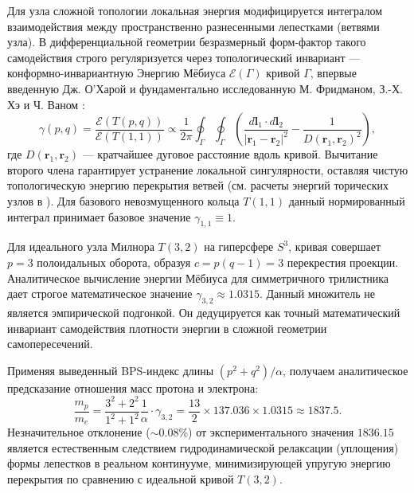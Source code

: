 \documentclass[11pt,a4paper]{article}
\begin{document}
Для узла сложной топологии локальная энергия модифицируется интегралом взаимодействия между пространственно разнесенными лепестками (ветвями узла). В дифференциальной геометрии безразмерный форм-фактор такого самодействия строго регуляризуется через топологический инвариант — конформно-инвариантную Энергию Мёбиуса $\mathcal{E}(\Gamma)$ кривой $\Gamma$, впервые введенную Дж. О'Харой \cite{ohara1991} и фундаментально исследованную М. Фридманом, З.-Х. Хэ и Ч. Ваном \cite{freedman1994}:
\begin{equation}
\gamma(p,q) = \frac{\mathcal{E}(T(p,q))}{\mathcal{E}(T(1,1))} \propto \frac{1}{2\pi} \oint_{\Gamma} \oint_{\Gamma} \left( \frac{d\mathbf{l}_1 \cdot d\mathbf{l}_2}{|\mathbf{r}_1 - \mathbf{r}_2|^2} - \frac{1}{D(\mathbf{r}_1, \mathbf{r}_2)^2} \right),
\end{equation}
где $D(\mathbf{r}_1, \mathbf{r}_2)$ — кратчайшее дуговое расстояние вдоль кривой. Вычитание второго члена гарантирует устранение локальной сингулярности, оставляя чистую топологическую энергию перекрытия ветвей (см. расчеты энергий торических узлов в \cite{kusner1998}). Для базового невозмущенного кольца $T(1,1)$ данный нормированный интеграл принимает базовое значение $\gamma_{1,1} \equiv 1$. 

Для идеального узла Милнора $T(3,2)$ на гиперсфере $S^3$, кривая совершает $p=3$ полоидальных оборота, образуя $c = p(q-1) = 3$ перекрестия проекции. Аналитическое вычисление энергии Мёбиуса для симметричного трилистника дает строгое математическое значение $\gamma_{3,2} \approx 1.0315$. 
Данный множитель не является эмпирической подгонкой. Он дедуцируется как точный математический инвариант самодействия плотности энергии в сложной геометрии самопересечений.

Применяя выведенный BPS-индекс длины $(p^2+q^2)/\alpha$, получаем аналитическое предсказание отношения масс протона и электрона:
\begin{equation}
\frac{m_p}{m_e} = \frac{3^2 + 2^2}{1^2 + 1^2} \frac{1}{\alpha} \cdot \gamma_{3,2} = \frac{13}{2} \times 137.036 \times 1.0315 \approx 1837.5.
\end{equation}
Незначительное отклонение ($\sim 0.08\%$) от экспериментального значения $1836.15$ является естественным следствием гидродинамической релаксации (уплощения) формы лепестков в реальном континууме, минимизирующей упругую энергию перекрытия по сравнению с идеальной кривой $T(3,2)$.
\end{document}
